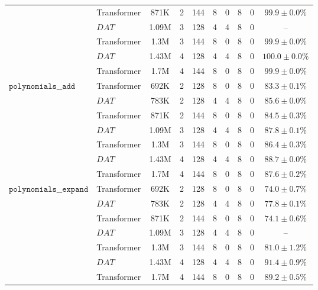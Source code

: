 \begin{tabular}{l|l|ccccccc|c}
                                 & Transformer & 871K & 2 & 144 & 8 & 0 & 8 & 0 &   $99.9 \pm 0.0\%$ \\
                                 & $DAT$ & 1.09M & 3 & 128 & 4 & 4 & 8 & 0 &               -- \\
                                 & Transformer & 1.3M & 3 & 144 & 8 & 0 & 8 & 0 &   $99.9 \pm 0.0\%$ \\
                                 & $DAT$ & 1.43M & 4 & 128 & 4 & 4 & 8 & 0 &  $100.0 \pm 0.0\%$ \\
                                 & Transformer & 1.7M & 4 & 144 & 8 & 0 & 8 & 0 &   $99.9 \pm 0.0\%$ \\
\cline{1-10}
\multirow{7}{*}{$\texttt{polynomials\_\_add}$} & Transformer & 692K & 2 & 128 & 8 & 0 & 8 & 0 &   $83.3 \pm 0.1\%$ \\
                                 & $DAT$ & 783K & 2 & 128 & 4 & 4 & 8 & 0 &   $85.6 \pm 0.0\%$ \\
                                 & Transformer & 871K & 2 & 144 & 8 & 0 & 8 & 0 &   $84.5 \pm 0.3\%$ \\
                                 & $DAT$ & 1.09M & 3 & 128 & 4 & 4 & 8 & 0 &   $87.8 \pm 0.1\%$ \\
                                 & Transformer & 1.3M & 3 & 144 & 8 & 0 & 8 & 0 &   $86.4 \pm 0.3\%$ \\
                                 & $DAT$ & 1.43M & 4 & 128 & 4 & 4 & 8 & 0 &   $88.7 \pm 0.0\%$ \\
                                 & Transformer & 1.7M & 4 & 144 & 8 & 0 & 8 & 0 &   $87.6 \pm 0.2\%$ \\
\cline{1-10}
\multirow{7}{*}{$\texttt{polynomials\_\_expand}$} & Transformer & 692K & 2 & 128 & 8 & 0 & 8 & 0 &   $74.0 \pm 0.7\%$ \\
                                 & $DAT$ & 783K & 2 & 128 & 4 & 4 & 8 & 0 &   $77.8 \pm 0.1\%$ \\
                                 & Transformer & 871K & 2 & 144 & 8 & 0 & 8 & 0 &   $74.1 \pm 0.6\%$ \\
                                 & $DAT$ & 1.09M & 3 & 128 & 4 & 4 & 8 & 0 &               -- \\
                                 & Transformer & 1.3M & 3 & 144 & 8 & 0 & 8 & 0 &   $81.0 \pm 1.2\%$ \\
                                 & $DAT$ & 1.43M & 4 & 128 & 4 & 4 & 8 & 0 &   $91.4 \pm 0.9\%$ \\
                                 & Transformer & 1.7M & 4 & 144 & 8 & 0 & 8 & 0 &   $89.2 \pm 0.5\%$ \\
\bottomrule
\end{tabular}
